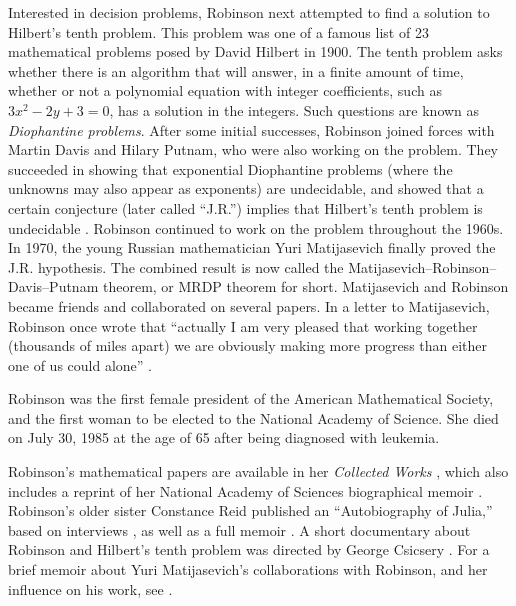 \documentclass[../../../include/open-logic-section]{subfiles}
\begin{document}
Interested in decision problems, Robinson next attempted to find a
solution to Hilbert's tenth problem. This problem was one of a famous
list of 23 mathematical problems posed by David Hilbert in 1900. The
tenth problem asks whether there is an algorithm that will answer, in
a finite amount of time, whether or not a polynomial equation with
integer coefficients, such as $3x^2 - 2y +3 = 0$, has a solution in
the integers. Such questions are known as \emph{Diophantine problems}.
After some initial successes, Robinson joined forces with Martin Davis
and Hilary Putnam, who were also working on the problem. They
succeeded in showing that exponential Diophantine problems (where the
unknowns may also appear as exponents) are undecidable, and showed
that a certain conjecture (later called ``J.R.'')  implies that
Hilbert's tenth problem is undecidable
\citep{DavisPutnamRobinson1961}.  Robinson continued to work on the
problem throughout the 1960s.  In 1970, the young Russian
mathematician Yuri Matijasevich finally proved the J.R. hypothesis.
The combined result is now called the
Matijasevich--Robinson--Davis--Putnam theorem, or MRDP theorem for short.
Matijasevich and Robinson became friends and collaborated on several
papers. In a letter to Matijasevich, Robinson once wrote that
``actually I am very pleased that working together (thousands of miles
apart) we are obviously making more progress than either one of us
could alone'' \citep[45]{Matijasevich1992}.

Robinson was the first female president of the American Mathematical
Society, and the first woman to be elected to the National
Academy of Science. She died on July 30, 1985 at the age of 65 after
being diagnosed with leukemia.

\begin{reading}
Robinson's mathematical papers are available in her \textit{Collected
  Works} \citep{Robinson1996}, which also includes a reprint of her
National Academy of Sciences biographical memoir
\citep{Feferman1994}. Robinson's older sister Constance Reid published
an ``Autobiography of Julia,'' based on interviews \citep{Reid1986},
as well as a full memoir \citep{Reid1996}. A short documentary about
Robinson and Hilbert's tenth problem was directed by George Csicsery
\citep{Csicsery2016}. For a brief memoir about Yuri Matijasevich's
collaborations with Robinson, and her influence on his work, see
\citep{Matijasevich1992}.
\end{reading}
\end{document}
